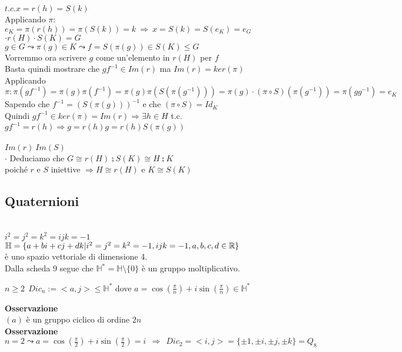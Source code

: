 \documentclass[12px]{article}
\begin{document}
	 $t.c. x = r(h) = S(k)$\\
	 Applicando $\pi:$\\
	 $e_K = \pi(r(h)) = \pi(S(k)) = k \ \Rightarrow \ x = S(k) = S(e_K) = e_G$ \\
	 $\cdot r(H)\cdot S(K) = G$\\
	 $g\in G \leadsto \pi(g)\in K \leadsto f = S(\pi(g))\in S(K)\leq G$ \\
	 Vorremmo ora scrivere $g$ come un'elemento in $r(H)$ per $f$\\
	 Basta quindi mostrare che  $gf^{-1}\in Im(r)$ ma  $Im(r) = ker(\pi)$\\
	 Applicando  $\pi: \pi(gf^{-1}) = \pi(g)\pi(f^{-1}) = \pi(g)\pi(S(\pi(g^{-1}))) = \pi(g)\cdot(\pi\circ S)(\pi(g^{-1}))= \pi(gg^{-1}) = e_K$\\
	 Sapendo che  $f^{-1} = (S(\pi(g)))^{-1}$ e che $(\pi\circ S) = Id_K$\\
	 Quindi  $gf^{-1}\in ker(\pi) = Im(r) \Rightarrow \exists h\in H$ t.c. $gf^{-1} = r(h) \Rightarrow g = r(h)g = r(h)S(\pi(g))$ \\
	 \text{ }\storto \ni \ \ \ \ \ \storto\ni\\
	 $Im(r) \  Im(S)$ \\
	 $\cdot$ Deduciamo che $G\cong r(H)\semi S(K)\cong H\semi K$\\
	 poiché  $r$ e $S$  iniettive $ \Rightarrow H\cong r(H)$ e $ K\cong S(K)$
	 \subsection{Quaternioni}\\
	 $i^2 = j^2 = k^2 = ijk = -1$\\
	 $\mathbb H = \{a + bi + cj + dk | i^2 = j^2 = k^2 = -1, ijk = -1, a,b,c,d\in \mathbb{R}\}$\\
	 è uno spazio vettoriale di dimensione 4. \\
	 Dalla scheda 9 segue che  $\mathbb H^* = \mathbb H\setminus\{0\}$ è un gruppo moltiplicativo.\\
	 \begin{defi}
	 	$n\geq 2 \ \ Dic_n:= <a,j> \leq \mathbb H^*$ dove  $a = \cos(\frac \pi n) + i\sin(\frac \pi n)\in \mathbb H^*$
	 \end{defi}
	 \textbf{Osservazione}\\
	 $(a)$ è un gruppo ciclico di ordine $2n$\\
	  \textbf{Osservazione}\\
	  $n = 2 \leadsto a = \cos(\frac \pi 2 ) + i \sin (\frac \pi 2) = i \ \ \Rightarrow  \ \ Dic_2 = <i,j> = \{\pm 1,\pm i, \pm j,\pm k\} = Q_8$ \\
\end{document}
